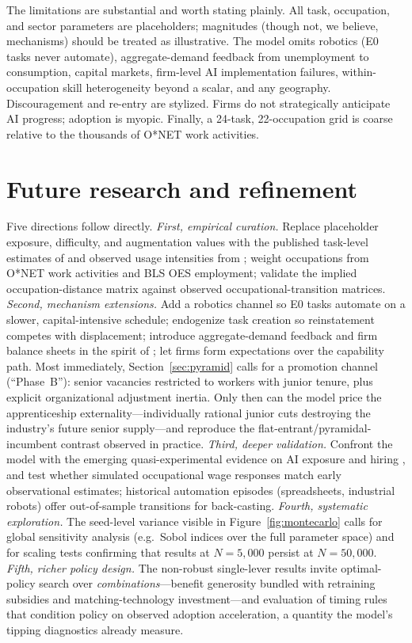 \documentclass[11pt,a4paper]{article}
\begin{document}
The limitations are substantial and worth stating plainly. All task, occupation, and
sector parameters are placeholders; magnitudes (though not, we believe, mechanisms)
should be treated as illustrative. The model omits robotics (E0 tasks never automate),
aggregate-demand feedback from unemployment to consumption, capital markets, firm-level
AI implementation failures, within-occupation skill heterogeneity beyond a scalar, and
any geography. Discouragement and re-entry are stylized. Firms do not strategically
anticipate AI progress; adoption is myopic. Finally, a 24-task, 22-occupation grid is
coarse relative to the thousands of O*NET work activities.

\section{Future research and refinement}
\label{sec:future}

Five directions follow directly. \emph{First, empirical curation.} Replace placeholder
exposure, difficulty, and augmentation values with the published task-level estimates of
\citet{eloundou2024gpts} and observed usage intensities from \citet{handa2025economic};
weight occupations from O*NET work activities and BLS OES employment; validate the
implied occupation-distance matrix against observed occupational-transition matrices.
\emph{Second, mechanism extensions.} Add a robotics channel so E0 tasks automate on a
slower, capital-intensive schedule; endogenize task creation
\citep{acemoglu2019automation} so reinstatement competes with displacement; introduce
aggregate-demand feedback and firm balance sheets in the spirit of
\citet{dosi2010schumpeter}; let firms form expectations over the capability path. Most
immediately, Section~\ref{sec:pyramid} calls for a promotion channel (``Phase~B''):
senior vacancies restricted to workers with junior tenure, plus explicit organizational
adjustment inertia. Only then can the model price the apprenticeship
externality---individually rational junior cuts destroying the industry's future senior
supply---and reproduce the flat-entrant/pyramidal-incumbent contrast observed in
practice.
\emph{Third, deeper validation.} Confront the model with the emerging quasi-experimental
evidence on AI exposure and hiring \citep{hampole2025ai}, and test whether simulated
occupational wage responses match early observational estimates; historical automation
episodes (spreadsheets, industrial robots) offer out-of-sample transitions for
back-casting. \emph{Fourth, systematic exploration.} The seed-level variance visible in
Figure~\ref{fig:montecarlo} calls for global sensitivity analysis (e.g.\ Sobol indices
over the full parameter space) and for scaling tests confirming that results at
$N=5{,}000$ persist at $N=50{,}000$. \emph{Fifth, richer policy design.} The non-robust
single-lever results invite optimal-policy search over \emph{combinations}---benefit generosity
bundled with retraining subsidies and matching-technology investment---and evaluation of
timing rules that condition policy on observed adoption acceleration, a quantity the
model's tipping diagnostics already measure.
\end{document}
